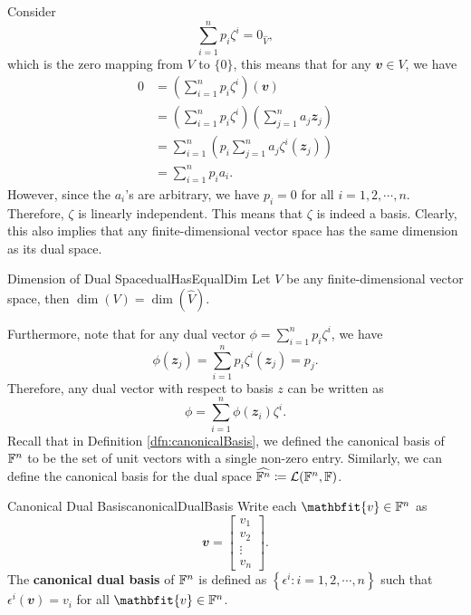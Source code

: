 \documentclass[math, code]{amznotes}
\theoremstyle{remark}
\begin{document}
Consider
\begin{equation*}
    \sum_{i = 1}^{n}p_i\zeta^i = 0_{\widehat{V}},
\end{equation*}
which is the zero mapping from $V$ to $\{0\}$, this means that for any $\mathbfit{v} \in V$, we have
\begin{align*}
    0 & = \left(\sum_{i = 1}^{n}p_i\zeta^i\right)(\mathbfit{v}) \\
    & = \left(\sum_{i = 1}^{n}p_i\zeta^i\right)\left(\sum_{j = 1}^{n}a_j\mathbfit{z}_j\right) \\
    & = \sum_{i = 1}^{n}\left(p_i\sum_{j = 1}^{n}a_j\zeta^i(\mathbfit{z}_j)\right) \\
    & = \sum_{i = 1}^{n}p_ia_i.
\end{align*}
However, since the $a_i$'s are arbitrary, we have $p_i = 0$ for all $i = 1, 2, \cdots, n$. Therefore, $\zeta$ is linearly independent. This means that $\zeta$ is indeed a basis. Clearly, this also implies that any finite-dimensional vector space has the same dimension as its dual space. 
\begin{probox}{Dimension of Dual Space}{dualHasEqualDim}
    Let $V$ be any finite-dimensional vector space, then $\dim(V) = \dim\left(\widehat{V}\right)$.
\end{probox}
Furthermore, note that for any dual vector $\phi = \sum_{i = 1}^{n}p_i\zeta^i$, we have
\begin{equation*}
    \phi(\mathbfit{z}_j) = \sum_{i = 1}^{n}p_i\zeta^i(\mathbfit{z}_j) = p_j.
\end{equation*}
Therefore, any dual vector with respect to basis $z$ can be written as
\begin{equation*}
    \phi = \sum_{i = 1}^{n}\phi(\mathbfit{z}_i)\zeta^i.
\end{equation*}
Recall that in Definition \ref{dfn:canonicalBasis}, we defined the canonical basis of $\mathbb{F}^n$ to be the set of unit vectors with a single non-zero entry. Similarly, we can define the canonical basis for the dual space $\widehat{\mathbb{F}^n} \coloneqq \mathcal{L}(\mathbb{F}^n, \mathbb{F})$.
\begin{dfnbox}{Canonical Dual Basis}{canonicalDualBasis}
    Write each $\mathbfit{v} \in \F^n$ as
    \begin{equation*}
        \mathbfit{v} = \begin{bmatrix}
            v_1 \\
            v_2 \\
            \vdots \\
            v_n
        \end{bmatrix}.
    \end{equation*}
    The {\color{red} \textbf{canonical dual basis}} of $\mathbb{F}^n$ is defined as $\left\{\epsilon^i \colon i = 1, 2, \cdots, n\right\}$ such that $\epsilon^i(\mathbfit{v}) = v_i$ for all $\mathbfit{v} \in \F^n$.
\end{dfnbox}
\end{document}

